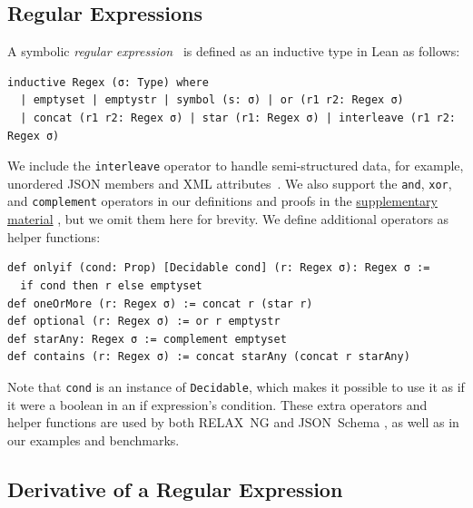 \documentclass[runningheads]{llncs}
\newcommand{\RelaxNG}{%
  RELAX~NG\xspace%
}
\newcommand{\JSONSchema}{%
  JSON~Schema\xspace%
}
\newcommand{\supplementarymaterial}{%
  \hyperref[supplementary_material]{supplementary material}\xspace%
}
\newcommand{\JSON}{\ac{JSON}\xspace}
\newcommand{\XML}{\ac{XML}\xspace}
\begin{document}
\subsection{Regular Expressions}
A symbolic \emph{regular expression}~\cite{brzozowski1964derivatives,stanford2021symbolic,elliott2021symbolic} is defined as an inductive type in Lean as follows:
\begin{lstlisting}[label=Regex]
inductive Regex (σ: Type) where
  | emptyset | emptystr | symbol (s: σ) | or (r1 r2: Regex σ)
  | concat (r1 r2: Regex σ) | star (r1: Regex σ) | interleave (r1 r2: Regex σ)
\end{lstlisting}
We include the \lstinline{interleave} operator to handle semi-structured data, for example, unordered \JSON members and \XML attributes~\cite{hosoya2010foundations}.
We also support the \lstinline{and}, \lstinline{xor}, and \lstinline{complement} operators in our definitions and proofs in the \supplementarymaterial, but we omit them here for brevity.
We define additional operators as helper functions:
\begin{lstlisting}
def onlyif (cond: Prop) [Decidable cond] (r: Regex σ): Regex σ :=
  if cond then r else emptyset
def oneOrMore (r: Regex σ) := concat r (star r)
def optional (r: Regex σ) := or r emptystr
def starAny: Regex σ := complement emptyset
def contains (r: Regex σ) := concat starAny (concat r starAny)
\end{lstlisting}
Note that \lstinline{cond} is an instance of \lstinline{Decidable}, which makes it possible to use it as if it were a boolean in an if expression's condition.
These extra operators and helper functions are used by both \RelaxNG and \JSONSchema, as well as in our examples and benchmarks.

\subsection{Derivative of a Regular Expression}
\end{document}
